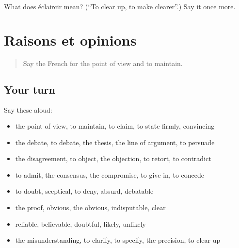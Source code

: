 \begin{tcolorbox}[breakable,colback=teal!4,colframe=teal!35!black,title={Before you move on}]
What does éclaircir mean? (\textquotedblleft{}To clear up, to make clearer\textquotedblright{}.) Say it once more.
\end{tcolorbox}
\section[(dialogue)]{Raisons et opinions}

\label{lesson:FR-R341-revision-334-341}



\begin{quote}
Say the French for the point of view and to maintain.
\end{quote}

\subsection*{Your turn}
Say these aloud:

\begin{itemize}
\raggedright
  \item the point of view, to maintain, to claim, to state firmly, convincing
  \item the debate, to debate, the thesis, the line of argument, to persuade
  \item the disagreement, to object, the objection, to retort, to contradict
  \item to admit, the consensus, the compromise, to give in, to concede
  \item to doubt, sceptical, to deny, absurd, debatable
  \item the proof, obvious, the obvious, indisputable, clear
  \item reliable, believable, doubtful, likely, unlikely
  \item the misunderstanding, to clarify, to specify, the precision, to clear up
\end{itemize}

